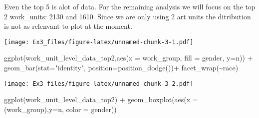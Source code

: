 \documentclass[
]{article}
\newenvironment{Shaded}{\begin{snugshade}}{\end{snugshade}}
\newcommand{\AttributeTok}[1]{\textcolor[rgb]{0.77,0.63,0.00}{#1}}
\newcommand{\DecValTok}[1]{\textcolor[rgb]{0.00,0.00,0.81}{#1}}
\newcommand{\FunctionTok}[1]{\textcolor[rgb]{0.00,0.00,0.00}{#1}}
\newcommand{\NormalTok}[1]{#1}
\newcommand{\OtherTok}[1]{\textcolor[rgb]{0.56,0.35,0.01}{#1}}
\newcommand{\SpecialCharTok}[1]{\textcolor[rgb]{0.00,0.00,0.00}{#1}}
\newcommand{\StringTok}[1]{\textcolor[rgb]{0.31,0.60,0.02}{#1}}
\begin{document}
Even the top 5 is alot of data. For the remaining analysis we will focus
on the top 2 work\_units: 2130 and 1610. Since we are only using 2 art
units the ditribution is not as relenvant to plot at the moment.

\begin{Shaded}
\end{Shaded}

\texttt{[image: Ex3\_files/figure-latex/unnamed-chunk-3-1.pdf]}

\begin{Shaded}
\begin{Highlighting}[]
\FunctionTok{ggplot}\NormalTok{(work\_unit\_level\_data\_top2,}\FunctionTok{aes}\NormalTok{(}\AttributeTok{x =}\NormalTok{ work\_group, }\AttributeTok{fill =}\NormalTok{ gender, }\AttributeTok{y=}\NormalTok{n)) }\SpecialCharTok{+}
  \FunctionTok{geom\_bar}\NormalTok{(}\AttributeTok{stat=}\StringTok{"identity"}\NormalTok{, }\AttributeTok{position=}\FunctionTok{position\_dodge}\NormalTok{())}\SpecialCharTok{+}
  \FunctionTok{facet\_wrap}\NormalTok{(}\SpecialCharTok{\textasciitilde{}}\NormalTok{race)}
\end{Highlighting}
\end{Shaded}

\texttt{[image: Ex3\_files/figure-latex/unnamed-chunk-3-2.pdf]}

\begin{Shaded}
\begin{Highlighting}[]
\FunctionTok{ggplot}\NormalTok{(work\_unit\_level\_data\_top2) }\SpecialCharTok{+}
  \FunctionTok{geom\_boxplot}\NormalTok{(}\FunctionTok{aes}\NormalTok{(}\AttributeTok{x =}\NormalTok{ (work\_group),}\AttributeTok{y=}\NormalTok{n, }\AttributeTok{color =}\NormalTok{ gender))}
\end{Highlighting}
\end{Shaded}
\end{document}
